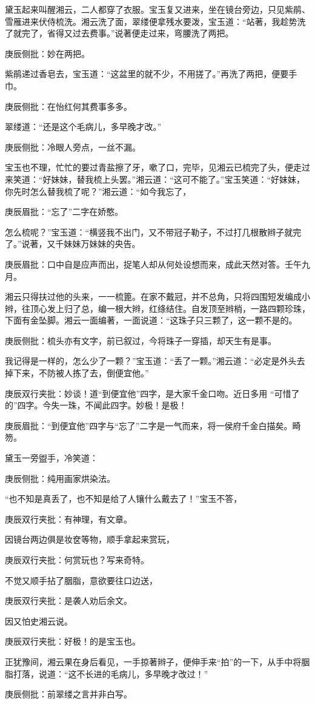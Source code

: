 \begin{parag}
    黛玉起来叫醒湘云，二人都穿了衣服。宝玉复又进来，坐在镜台旁边，只见紫鹃、雪雁进来伏侍梳洗。湘云洗了面，翠缕便拿残水要泼，宝玉道：“站著，我趁势洗了就完了，省得又过去费事。”说著便走过来，弯腰洗了两把。\begin{note}庚辰侧批：妙在两把。\end{note}紫鹃递过香皂去，宝玉道：“这盆里的就不少，不用搓了。”再洗了两把，便要手巾。\begin{note}庚辰侧批：在怡红何其费事多多。\end{note}翠缕道：“还是这个毛病儿，多早晚才改。”\begin{note}庚辰侧批：冷眼人旁点，一丝不漏。\end{note}宝玉也不理，忙忙的要过青盐擦了牙，嗽了口，完毕，见湘云已梳完了头，便走过来笑道：“好妹妹，替我梳上头罢。”湘云道：“这可不能了。”宝玉笑道：“好妹妹，你先时怎么替我梳了呢？”湘云道：“如今我忘了，\begin{note}庚辰眉批：“忘了”二字在娇憨。\end{note}怎么梳呢？”宝玉道：“横竖我不出门，又不带冠子勒子，不过打几根散辫子就完了。”说著，又千妹妹万妹妹的央告。\begin{note}庚辰眉批：口中自是应声而出，捉笔人却从何处设想而来，成此天然对答。壬午九月。\end{note}湘云只得扶过他的头来，一一梳篦。在家不戴冠，并不总角，只将四围短发编成小辫，往顶心发上归了总，编一根大辫，红绦结住。自发顶至辫梢，一路四颗珍珠，下面有金坠脚。湘云一面编著，一面说道：“这珠子只三颗了，这一颗不是的。\begin{note}庚辰侧批：梳头亦有文字，前已叙过，今将珠子一穿插，却天生有是事。\end{note}我记得是一样的，怎么少了一颗？”宝玉道：“丢了一颗。”湘云道：“必定是外头去掉下来，不防被人拣了去，倒便宜他。”\begin{note}庚辰双行夹批：妙谈！道“到便宜他”四字，是大家千金口吻。近日多用 “可惜了的”四字。今失一珠，不闻此四字。妙极！是极！\end{note}\begin{note}庚辰眉批：“到便宜他”四字与“忘了”二字是一气而来，将一侯府千金白描矣。畸笏。\end{note}黛玉一旁盥手，冷笑道：\begin{note}庚辰侧批：纯用画家烘染法。\end{note}“也不知是真丢了，也不知是给了人镶什么戴去了！”宝玉不答，\begin{note}庚辰双行夹批：有神理，有文章。\end{note}因镜台两边俱是妆奁等物，顺手拿起来赏玩，\begin{note}庚辰双行夹批：何赏玩也？写来奇特。\end{note}不觉又顺手拈了胭脂，意欲要往口边送，\begin{note}庚辰双行夹批：是袭人劝后余文。\end{note}因又怕史湘云说。\begin{note}庚辰双行夹批：好极！的是宝玉也。\end{note}正犹豫间，湘云果在身后看见，一手掠著辫子，便伸手来“拍”的一下，从手中将胭脂打落，说道：“这不长进的毛病儿，多早晚才改过！”\begin{note}庚辰侧批：前翠缕之言并非白写。\end{note}

\end{parag}
